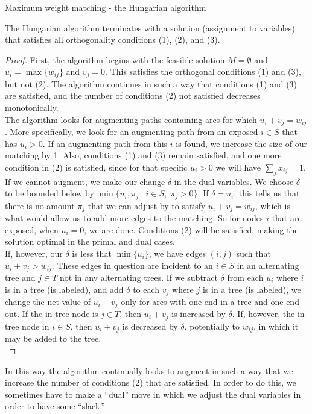 \documentclass[11pt]{article}
\renewcommand{\'}{^{'}}
\newenvironment{theorem}[2][Theorem]{\begin{trivlist}
\item[\hskip \labelsep {\bfseries #1}\hskip \labelsep {\bfseries #2.}]}{\end{trivlist}}
\begin{document}
\begin{section}{Maximum weight matching - the Hungarian algorithm}
\begin{theorem}{}
	The Hungarian algorithm terminates with a solution (assignment to variables) that 
	satisfies all orthogonality conditions (1), (2), and (3).
\end{theorem}

\begin{proof}
	First, the algorithm begins with the feasible solution $M = \emptyset$ and 
	$u_i = \max \{w_{ij}\}$ and $v_j = 0$. This satisfies the orthogonal conditions 
	(1) and (3), but not (2). The algorithm continues in such a way that conditions 
	(1) and (3) are satisfied, and the number of conditions (2) not satisfied decreases 
	monotonically. \\
	The algorithm looks for augmenting paths containing arcs for which 
	$u_i + v_j = w_{ij}$. More specifically, we look for an augmenting path from an 
	exposed $i\in S$ that has $u_i > 0$. If an augmenting path from this $i$ is 
	found, we increase the size of our matching by 1. Also, conditions (1) and (3) 
	remain satisfied, and one more condition in (2) is satisfied, since for that 
	specific $u_i > 0$ we will have $\sum_{j} x_{ij} = 1$. If we cannot augment, we 
	make our change $\delta$ in the dual variables. We choose $\delta$ to be bounded 
	below by $\min \{u_i,\pi_j\; |\; i\in S,\; \pi_j > 0\}$. If $\delta = u_i$, this 
	tells us that there is no amount $\pi_j$ that we can adjust by to satisfy 
	$u_i + v_j = w_{ij}$, which is what would allow us to add more edges to the matching. 
	So for nodes $i$ that are exposed, when $u_i = 0$, we are done. Conditions (2) will 
	be satisfied, making the solution optimal in the primal and dual cases. \\
	If, however, our $\delta$ is less that $\min\{u_i\}$, we have edges $(i,j)$ 
	such that $u_i + v_j > w_{ij}$. These edges in question are incident to an 
	$i\in S$ in an alternating tree and $j\in T$ not in any alternating trees. 
	If we subtract $\delta$ 
	from each $u_i$ where $i$ is in a tree (is labeled), and add $\delta$ to each 
	$v_j$ where $j$ is in a tree (is labeled), we change the net value of $u_i + v_j$ 
	only for arcs with one end in a tree and one end out. If the in-tree node is 
	$j\in T$, then $u_i + v_j$ is increased by $\delta$. If, however, the in-tree node 
	in $i\in S$, then $u_i + v_j$ is decreased by $\delta$, potentially to $w_{ij}$, 
	in which it may be added to the tree.\\
\end{proof}
	In this way the algorithm continually looks to augment in such a way that we 
	increase the number of conditions (2) that are satisfied. In order to do this, we 
	sometimes have to make a ``dual'' move in which we adjust the dual variables in 
	order to have some ``slack.''

\end{section}
\end{document}
